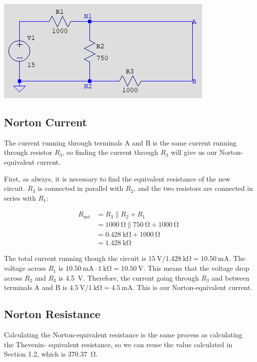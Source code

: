 \documentclass{article}
\begin{document}
\includegraphics{Images/circuit0_short.png}

\subsection{Norton Current}
The current running through terminals A and B is the same
current running through resistor \(R_3\), so finding the
current through \(R_3\) will give us our Norton-equivalent current.

First, as always, it is necessary to find the equivalent resistance
of the new circuit. \(R_3\) is connected in parallel with
\(R_2\), and the two resistors are connected in series with
\(R_1\):

\begin{align*}
    R_\text{net}
    &= R_3 \parallel R_2 + R_1\\
    &= \SI{1000}{\ohm} \parallel \SI{750}{\ohm} + \SI{1000}{\ohm}\\
    &= \SI{0.428}{\kilo\ohm} + \SI{1000}{\ohm}\\
    &= \SI{1.428}{\kilo\ohm}
\end{align*}

The total current running though the circuit is
\(\SI{15}{\volt} / \SI{1.428}{\kilo\ohm} = \SI{10.50}{\milli\ampere}\).
The voltage across \(R_1\) is
\(\SI{10.50}{\milli\ampere}\cdot\SI{1}{\kilo\ohm} = \SI{10.50}{\volt}\).
This means that the voltage drop across \(R_2\) and \(R_3\) is
\SI{4.5}{\volt}. Therefore, the current going through
\(R_3\) and between terminals A and B is
\(\SI{4.5}{\volt} / \SI{1}{\kilo\ohm} = \SI{4.5}{\milli\ampere}\).
This is our Norton-equivalent current.

\subsection{Norton Resistance} Calculating the Norton-equivalent
resistance is the same process as calculating the Thevenin-
equivalent resistance, so we can reuse the value calculated
in Section 1.2, which is \SI{370.37}{\ohm}.
\end{document}
